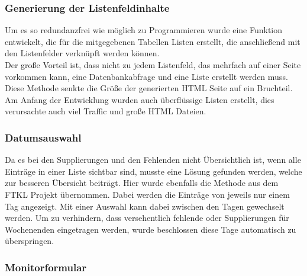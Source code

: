 \subsubsection{Generierung der Listenfeldinhalte}
Um es so redundanzfrei wie möglich zu Programmieren wurde eine Funktion entwickelt, die für die mitgegebenen Tabellen Listen erstellt, die anschließend mit den Listenfelder verknüpft werden können.\\
Der große Vorteil ist, dass nicht zu jedem Listenfeld, das mehrfach auf einer Seite vorkommen kann, eine Datenbankabfrage und eine Liste erstellt werden muss. Diese Methode senkte die Größe der generierten HTML Seite auf ein Bruchteil. Am Anfang der Entwicklung wurden auch überflüssige Listen erstellt, dies verursachte auch viel Traffic und große HTML Dateien.
\subsubsection{Datumsauswahl}
Da es bei den Supplierungen und den Fehlenden nicht Übersichtlich ist, wenn alle Einträge in einer Liste sichtbar sind, musste eine Lösung gefunden werden, welche zur besseren Übersicht beiträgt. Hier wurde ebenfalls die Methode aus dem FTKL Projekt übernommen. Dabei werden die Einträge von jeweils nur einem Tag angezeigt. Mit einer Auswahl kann dabei zwischen den Tagen gewechselt werden. Um zu verhindern, dass versehentlich fehlende oder Supplierungen für Wochenenden eingetragen werden, wurde beschlossen diese Tage automatisch zu überspringen.
\newpage
\subsubsection{Monitorformular}
